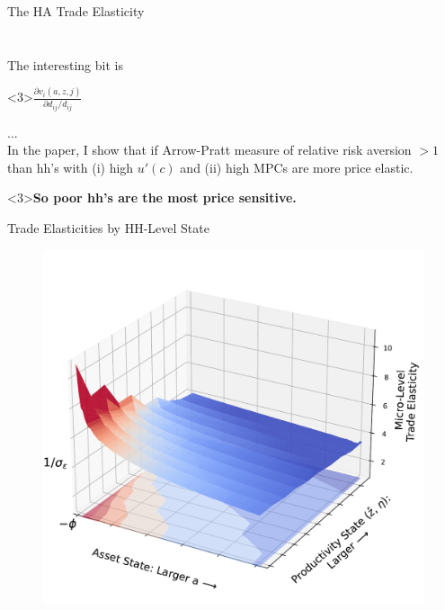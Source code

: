 \documentclass[9pt,pdftex,aspectratio=1610]{beamer}
\theoremstyle{definition}
\begin{document}
\begin{frame}[t]{The HA Trade Elasticity}
{{\begin{align*}
\end{align*}}\\
\medskip
The interesting bit is \begin{alert}<3>{$\frac{\partial v_{i}(a,z,j)}{\partial d_{ij}/d_{ij}}$}\end{alert} ...\\
\medskip
In the paper, I show that if Arrow-Pratt measure of relative risk aversion $ > 1$ than hh's with (i) high $u'(c)$ and (ii) high MPCs are more price elastic. \begin{alert}<3>{\textbf{So poor hh's are the most price sensitive.}}\end{alert}}
\end{frame}






%



\begin{frame}[t]{Trade Elasticities by HH-Level State}
\vspace{-.5cm}
\begin{figure}[t]
\centerline{
\includegraphics[scale = 0.5]{../notes/figures/micro-elasticity.pdf}}
\end{figure}
\end{frame}
\end{document}
